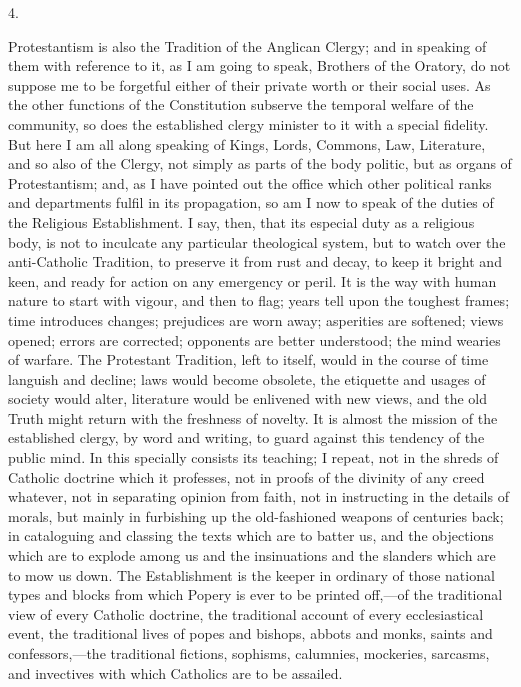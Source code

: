 4.

Protestantism is also the Tradition of the Anglican
Clergy; and in speaking of them with reference to it, as
I am going to speak, Brothers of the Oratory, do not
suppose me to be forgetful either of their private worth
or their social uses. As the other functions of the
Constitution subserve the temporal welfare of the
community, so does the established clergy minister to it
with a special fidelity. But here I am all along speaking
of Kings, Lords, Commons, Law, Literature, and so also of
the Clergy, not simply as parts of the body politic, but
as organs of Protestantism; and, as I have pointed out
the office which other political ranks and departments
fulfil in its propagation, so am I now to speak of the
duties of the Religious Establishment. I say, then, that
its especial duty as a religious body, is not to
inculcate any particular theological system, but to watch
over the anti-Catholic Tradition, to preserve it from
rust and decay, to keep it bright and keen, and ready for
action on any emergency or peril. It is the way with
human nature to start with vigour, and then to flag;
years tell upon the toughest frames; time introduces
changes; prejudices are worn away; asperities are
softened; views opened; errors are corrected; opponents
are better understood; the mind wearies of warfare. The
Protestant Tradition, left to itself, would in the course
of time languish and decline; laws would become obsolete,
the etiquette and usages of society would alter,
literature would be enlivened with new views, and the old
Truth might return with the freshness of novelty. It is
almost the mission of the established clergy, by word and
writing, to guard against this tendency of the public
mind. In this specially consists its teaching; I repeat,
not in the shreds of Catholic doctrine which it
professes, not in proofs of the divinity of any creed
whatever, not in separating opinion from faith, not in
instructing in the details of morals, but mainly in
furbishing up the old-fashioned weapons of centuries
back; in cataloguing and classing the texts which are to
batter us, and the objections which are to explode among
us and the insinuations and the slanders which are to mow
us down. The Establishment is the keeper in ordinary of
those national types and blocks from which Popery is ever
to be printed off,—of the traditional view of every
Catholic doctrine, the traditional account of every
ecclesiastical event, the traditional lives of popes and
bishops, abbots and monks, saints and
confessors,—the traditional fictions, sophisms,
calumnies, mockeries, sarcasms, and invectives with which
Catholics are to be assailed.

